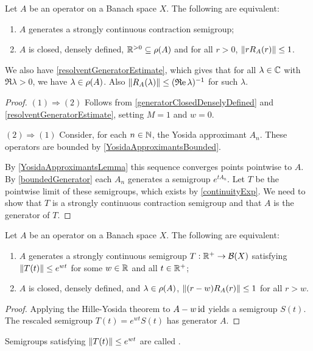 \begin{theorem} \label{HilleYosidaContraction}
Let $A$ be an operator on a Banach space $X$. The following are equivalent:
\begin{enumerate}
\item $A$ generates a strongly continuous contraction semigroup;
\item $A$ is closed, densely defined, $\mathbb{R}^{>0}\subseteq \rho(A)$ and for all $r > 0$, $\lVert rR_A(r)\rVert \leq 1$.
\end{enumerate}
\end{theorem}
We also have \ref{resolventGeneratorEstimate}, which gives that for all $\lambda\in\mathbb{C}$ with $\Re\lambda >0$, we have $\lambda\in\rho(A)$. Also $\lVert R_A(\lambda)\rVert \leq (\operatorname{\mathfrak{R}e} \lambda)^{-1}$ for such $\lambda$.
\begin{proof}
$(1)\Rightarrow (2)$ Follows from \ref{generatorClosedDenselyDefined} and \ref{resolventGeneratorEstimate}, setting $M = 1$ and $w = 0$.

$(2)\Rightarrow (1)$ Consider, for each $n\in \mathbb{N}$, the Yosida approximant $A_n$. These operators are bounded by \ref{YosidaApproximantsBounded}.

By \ref{YosidaApproximantsLemma} this sequence converges points pointwise to $A$. By \ref{boundedGenerator} each $A_n$ generates a semigroup $e^{tA_n}$. Let $T$ be the pointwise limit of these semigroups, which exists by \ref{continuityExp}. We need to show that $T$ is a strongly continuous contraction semigroup and that $A$ is the generator of $T$.


\end{proof}
\begin{corollary} \label{quasiContractiveHilleYosida}
Let $A$ be an operator on a Banach space $X$. The following are equivalent:
\begin{enumerate}
\item $A$ generates a strongly continuous semigroup $T: \mathbb{R}^+\to \operatorname{\mathcal{B}}(X)$ satisfying $\lVert T(t)\rVert\leq e^{wt}$ for some $w\in \mathbb{R}$ and all $t\in\mathbb{R}^+$;
\item $A$ is closed, densely defined, and $\lambda\in  \rho(A)$, $\lVert(r-w)R_A(r)\rVert \leq 1$ for all $r>w$.
\end{enumerate}
\end{corollary}
\begin{proof}
Applying the Hille-Yosida theorem to $A-w\operatorname{id}$ yields a semigroup $S(t)$. The rescaled semigroup $T(t) = e^{wt}S(t)$ has generator $A$.
\end{proof}
Semigroups satisfying $\lVert T(t)\rVert \leq e^{wt}$ are called .

